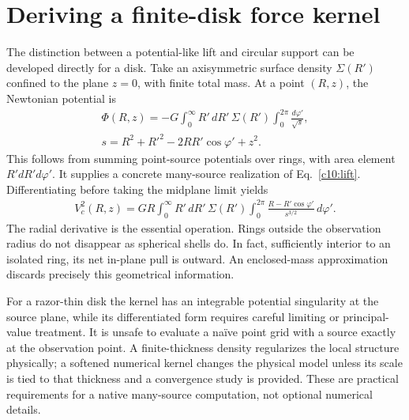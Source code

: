 \section{Deriving a finite-disk force kernel}

The distinction between a potential-like lift and circular support can be developed directly for a disk. Take an axisymmetric surface density $\Sigma(R')$ confined to the plane $z=0$, with finite total mass. At a point $(R,z)$, the Newtonian potential is
\begin{equation}
 \begin{split}
 \Phi(R,z)=-G\int_0^\infty R'\,dR'\,\Sigma(R')
 \int_0^{2\pi}\frac{d\varphi'}{\sqrt{s}},\\
 s=R^2+R'^2-2RR'\cos\varphi'+z^2.
 \end{split}
 \label{c10:diskkernel}
\end{equation}
This follows from summing point-source potentials over rings, with area element $R'dR'd\varphi'$. It supplies a concrete many-source realization of Eq.~\eqref{c10:lift}. Differentiating before taking the midplane limit yields
\begin{equation}
 \begin{split}
 V_c^2(R,z)=GR\int_0^\infty R'\,dR'\,\Sigma(R')
 \int_0^{2\pi}\frac{R-R'\cos\varphi'}{s^{3/2}}\,d\varphi'.
 \end{split}
 \label{c10:diskforcekernel}
\end{equation}
The radial derivative is the essential operation. Rings outside the observation radius do not disappear as spherical shells do. In fact, sufficiently interior to an isolated ring, its net in-plane pull is outward. An enclosed-mass approximation discards precisely this geometrical information.

For a razor-thin disk the kernel has an integrable potential singularity at the source plane, while its differentiated form requires careful limiting or principal-value treatment. It is unsafe to evaluate a naïve point grid with a source exactly at the observation point. A finite-thickness density regularizes the local structure physically; a softened numerical kernel changes the physical model unless its scale is tied to that thickness and a convergence study is provided. These are practical requirements for a native many-source computation, not optional numerical details.

